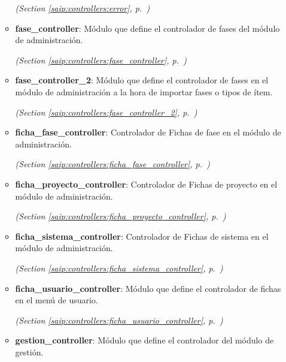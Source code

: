\begin{itemize}
\begin{itemize}
  \textit{(Section \ref{saip:controllers:error}, p.~\pageref{saip:controllers:error})}

    \item \textbf{fase\_controller}: Módulo que define el controlador de fases del módulo de administración.



  \textit{(Section \ref{saip:controllers:fase_controller}, p.~\pageref{saip:controllers:fase_controller})}

    \item \textbf{fase\_controller\_2}: Módulo que define el controlador de fases en el módulo de administración a 
la hora de importar fases o tipos de ítem.



  \textit{(Section \ref{saip:controllers:fase_controller_2}, p.~\pageref{saip:controllers:fase_controller_2})}

    \item \textbf{ficha\_fase\_controller}: Controlador de Fichas de fase en el módulo de administración.



  \textit{(Section \ref{saip:controllers:ficha_fase_controller}, p.~\pageref{saip:controllers:ficha_fase_controller})}

    \item \textbf{ficha\_proyecto\_controller}: Controlador de Fichas de proyecto en el módulo de administración.



  \textit{(Section \ref{saip:controllers:ficha_proyecto_controller}, p.~\pageref{saip:controllers:ficha_proyecto_controller})}

    \item \textbf{ficha\_sistema\_controller}: Controlador de Fichas de sistema en el módulo de administración.



  \textit{(Section \ref{saip:controllers:ficha_sistema_controller}, p.~\pageref{saip:controllers:ficha_sistema_controller})}

    \item \textbf{ficha\_usuario\_controller}: Módulo que define el controlador de fichas en el menú de usuario.



  \textit{(Section \ref{saip:controllers:ficha_usuario_controller}, p.~\pageref{saip:controllers:ficha_usuario_controller})}

    \item \textbf{gestion\_controller}: Módulo que define el controlador del módulo de gestión.




\end{itemize}
\end{itemize}
